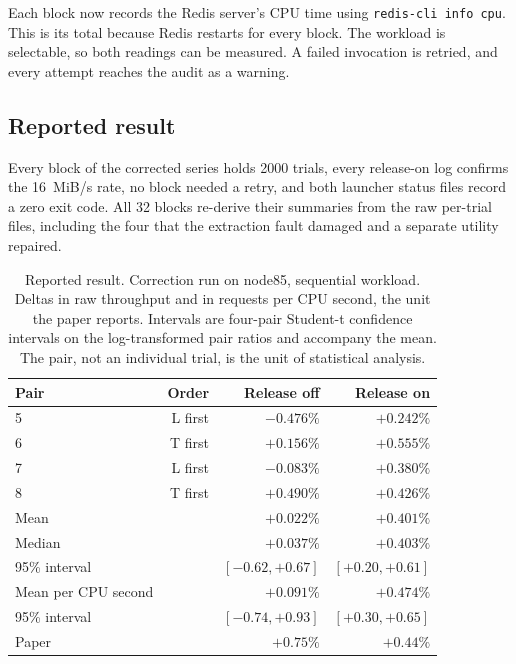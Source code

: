 \documentclass[sigconf]{acmart}
\begin{document}
Each block now records the Redis server's CPU time using \texttt{redis-cli
info cpu}. This is its total because Redis restarts for every block. The workload is selectable, so both readings can be measured. A
failed invocation is retried, and every attempt reaches the audit as a
warning.

\subsection{Reported result}
\label{sec:reported-result}

Every block of the corrected series holds 2000 trials, every release-on log
confirms the 16~MiB/s rate, no block needed a retry, and both launcher status
files record a zero exit code. All 32 blocks re-derive their summaries from the raw per-trial files,
including the four that the extraction fault damaged and a separate utility
repaired.

\begin{table}[ht]
\caption{Reported result. Correction run on node85, sequential workload. Deltas
in raw throughput and in requests per CPU second, the unit the paper reports.
Intervals are four-pair Student-t confidence intervals on the log-transformed
pair ratios and accompany the mean. The pair, not an individual trial, is the
unit of statistical analysis.}
\label{tab:correction-sequential}
\footnotesize
\begin{tabular}{@{}lrrr@{}}
\toprule
Pair & Order & Release off & Release on \\
\midrule
5 & L first & $-0.476\%$ & $+0.242\%$ \\
6 & T first & $+0.156\%$ & $+0.555\%$ \\
7 & L first & $-0.083\%$ & $+0.380\%$ \\
8 & T first & $+0.490\%$ & $+0.426\%$ \\
\midrule
Mean            & & $+0.022\%$ & $+0.401\%$ \\
Median          & & $+0.037\%$ & $+0.403\%$ \\
95\% interval   & & $[-0.62,+0.67]$ & $[+0.20,+0.61]$ \\
\midrule
Mean per CPU second   & & $+0.091\%$ & $+0.474\%$ \\
95\% interval         & & $[-0.74,+0.93]$ & $[+0.30,+0.65]$ \\
\midrule
Paper           & & $+0.75\%$ & $+0.44\%$ \\
\bottomrule
\end{tabular}
\end{table}
\end{document}
